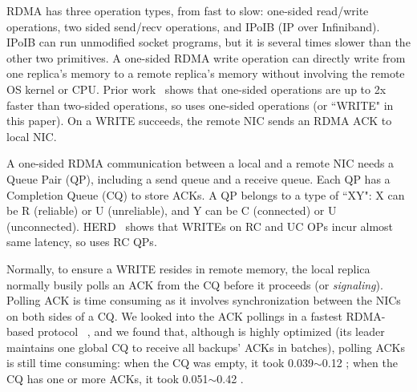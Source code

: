RDMA has three operation types, from fast to slow: one-sided 
read/write operations, two sided send/recv operations, and IPoIB (IP over 
Infiniband). IPoIB can run unmodified socket programs, but it is several times 
slower than the other two primitives. A one-sided RDMA write 
operation can directly write from one replica's memory to a remote 
replica's memory without involving the remote OS kernel or CPU. Prior 
work~\cite{pilaf:usenix14} shows that one-sided operations are up to 2x faster 
than two-sided operations, so \xxx uses one-sided operations (or 
``WRITE" in this paper). On a WRITE succeeds, the remote NIC sends
an RDMA ACK to local NIC.

A one-sided RDMA communication between a local and a remote NIC needs
a Queue Pair (QP), including a send queue and a receive 
queue. Each QP has a Completion Queue (CQ) to store ACKs. A QP 
belongs to a type of ``XY": X can be R (reliable) or U (unreliable), and Y can 
be C (connected) or U (unconnected). HERD~\cite{herd:sigcomm14} shows 
that WRITEs on RC and UC OPs incur almost same latency, so \xxx 
uses RC QPs.




Normally, to ensure a WRITE resides in remote memory, the local replica 
normally busily polls an ACK from the CQ before it proceeds 
(or \emph{signaling}). Polling ACK is time consuming as it involves 
synchronization between the NICs on both sides of a CQ. We looked into the ACK 
pollings in a fastest RDMA-based \paxos protocol \dare~\cite{dare:hpdc15}, and 
we found that, although \dare is highly optimized (its leader maintains one 
global CQ to receive all backups' ACKs in batches), polling ACKs is still time 
consuming: when the CQ was empty, it took 0.039$\sim$0.12 \us; when the CQ has 
one or more ACKs, it took 0.051$\sim$0.42 \us.



